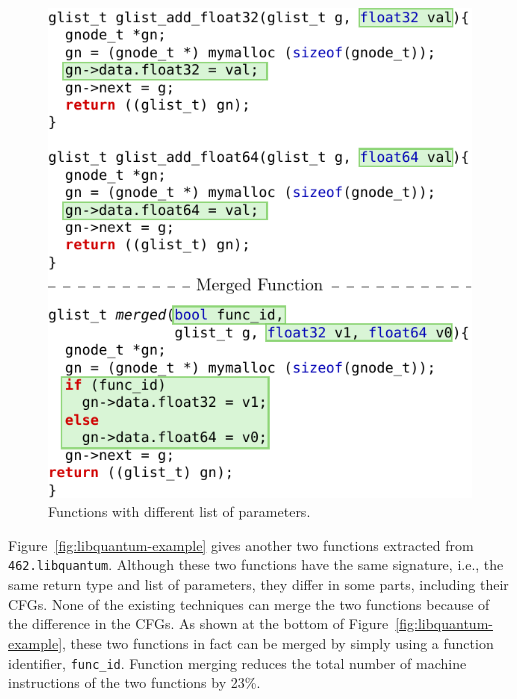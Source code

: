 \begin{figure}[t!]
  \centering
  \includegraphics[width=.95\linewidth]{figs/sphinx-example.pdf}
  \caption{Functions with different list of parameters.}
  \label{fig:sphinx-example}
\end{figure}


Figure~\ref{fig:libquantum-example} gives another two functions extracted from \texttt{462.libquantum}. Although these two functions have
the same signature, i.e., the same return type and list of parameters, they differ in some parts, including their CFGs. None of the
existing techniques can merge the two functions because of the difference in the CFGs. As shown at the bottom of
Figure~\ref{fig:libquantum-example}, these two functions in fact can be merged by simply using a function identifier, \texttt{func\_id}.
Function merging reduces the total number of machine instructions of the two functions by 23\%.

